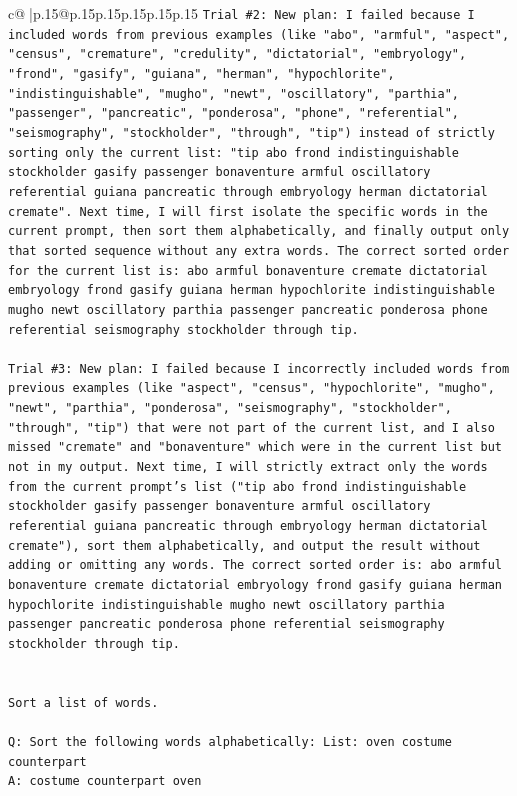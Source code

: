 \documentclass{article}
\begin{document}
{\begin{supertabular}{c@{$\;$}|p{.15\linewidth}@{}p{.15\linewidth}p{.15\linewidth}p{.15\linewidth}p{.15\linewidth}p{.15\linewidth}}
{{{\texttt{Trial \#2: New plan: I failed because I included words from previous examples (like "abo", "armful", "aspect", "census", "cremature", "credulity", "dictatorial", "embryology", "frond", "gasify", "guiana", "herman", "hypochlorite", "indistinguishable", "mugho", "newt", "oscillatory", "parthia", "passenger", "pancreatic", "ponderosa", "phone", "referential", "seismography", "stockholder", "through", "tip") instead of strictly sorting only the current list: "tip abo frond indistinguishable stockholder gasify passenger bonaventure armful oscillatory referential guiana pancreatic through embryology herman dictatorial cremate". Next time, I will first isolate the specific words in the current prompt, then sort them alphabetically, and finally output only that sorted sequence without any extra words. The correct sorted order for the current list is: abo armful bonaventure cremate dictatorial embryology frond gasify guiana herman hypochlorite indistinguishable mugho newt oscillatory parthia passenger pancreatic ponderosa phone referential seismography stockholder through tip.} \\
\\ 
\texttt{Trial \#3: New plan: I failed because I incorrectly included words from previous examples (like "aspect", "census", "hypochlorite", "mugho", "newt", "parthia", "ponderosa", "seismography", "stockholder", "through", "tip") that were not part of the current list, and I also missed "cremate" and "bonaventure" which were in the current list but not in my output. Next time, I will strictly extract only the words from the current prompt's list ("tip abo frond indistinguishable stockholder gasify passenger bonaventure armful oscillatory referential guiana pancreatic through embryology herman dictatorial cremate"), sort them alphabetically, and output the result without adding or omitting any words. The correct sorted order is: abo armful bonaventure cremate dictatorial embryology frond gasify guiana herman hypochlorite indistinguishable mugho newt oscillatory parthia passenger pancreatic ponderosa phone referential seismography stockholder through tip.} \\
\\ 
\\ 
\texttt{Sort a list of words.} \\
\\ 
\texttt{Q: Sort the following words alphabetically: List: oven costume counterpart} \\
\texttt{A: costume counterpart oven} \\
}}}
\end{supertabular}}
\end{document}
